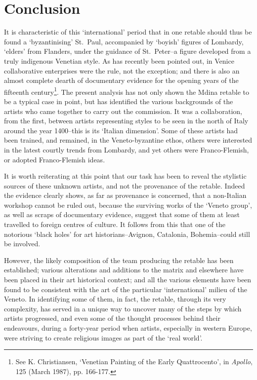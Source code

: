 \documentclass[a4paper,12pt]{article}
\begin{document}
\section{Conclusion}

It is characteristic of this `international' period that in one
retable should thus be found a `byzantinising' St.~Paul, accompanied
by `boyish' figures of Lombardy, `elders' from Flanders, under the
guidance of St.~Peter--a figure developed from a truly indigenous
Venetian style. As has recently been pointed out, in Venice
collaborative enterprises were the rule, not the exception; and there
is also an almost complete dearth of documentary evidence for the
opening years of the fifteenth century\footnote{See K. Christiansen,
`Venetian Painting of the Early Quattrocento', in \textit{Apollo}, 125
(March 1987), pp. 166-177.}.  The present analysis has not only shown
the Mdina retable to be a typical case in point, but has identified
the various backgrounds of the artists who came together to carry out
the commission. It was a collaboration, from the first, between
artists representing 
styles to be seen in the north of Italy around the year 1400--this is
its `Italian dimension'.  Some of these artists had been trained, and
remained, in the Veneto-byzantine ethos, others were interested in the
latest courtly trends from Lombardy, and yet others were
Franco-Flemish, or adopted Franco-Flemish ideas.

It is worth reiterating at this point that our task has been to reveal
the stylistic sources of these unknown artists, and not the provenance
of the retable. Indeed the evidence clearly shows, as far as
provenance is concerned, that a non-Italian workshop cannot be ruled
out, because the surviving works of the `Veneto group', as well as
scraps of documentary evidence, suggest that some of them at least
travelled to foreign centres of culture. It follows from this that one
of the notorious `black holes' for art historians--Avignon,
Catalonia, Bohemia--could still be involved.

However, the likely composition of the team producing the retable has
been established; various alterations and additions to the matrix and
elsewhere have been placed in their art historical context; and all
the various elements have been found to be consistent with the art of
the particular `international' milieu of the Veneto. In identifying
some of them, in fact, the retable, through its very complexity, has
served in a unique way to uncover many of the steps by which artists
progressed, and even some of the thought processes behind their
endeavours, during a forty-year period when artists, especially in
western Europe, were striving to create religious images as part of
the `real world'.
\end{document}
